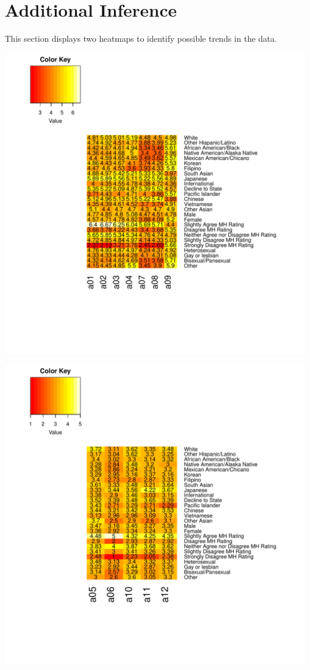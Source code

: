\documentclass{article}\usepackage[]{graphicx}\usepackage[]{color}
\makeatletter
\def\maxwidth{ %
  \ifdim\Gin@nat@width>\linewidth
    \linewidth
  \else
    \Gin@nat@width
  \fi
}
\makeatother
\begin{document}
\pagebreak

\section{Additional Inference}
This section displays two heatmaps to identify possible trends in the data. 



\includegraphics[width=\maxwidth]{figure/unnamed-chunk-18-1} \hfill{}




\includegraphics[width=\maxwidth]{figure/unnamed-chunk-18-2} \hfill{}
\end{document}
